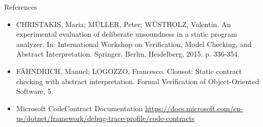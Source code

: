 \begin{frame}{References}

\vspace*{-0.8cm}

\small

\begin{itemize}
  \item CHRISTAKIS, Maria; MÜLLER, Peter; WÜSTHOLZ, Valentin. An experimental
  evaluation of deliberate unsoundness in a static program analyzer. In:
  International Workshop on Verification, Model Checking, and Abstract
  Interpretation. Springer, Berlin, Heidelberg, 2015. p. 336-354.

  \vspace*{0.4cm}

  \item F{\"A}HNDRICH, Manuel; LOGOZZO, Francesco. Clousot: Static contract
  checking with abstract interpretation. Formal Verification of Object-Oriented
  Software, 5.

  \vspace*{0.4cm}

  \item Microsoft CodeContract Documentation
  \url{https://docs.microsoft.com/en-us/dotnet/framework/debug-trace-profile/code-contracts}
\end{itemize}

\end{frame}